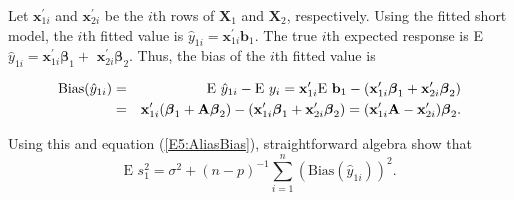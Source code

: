 Let $\mathbf{x}_{1i}^{\prime }$ and $\mathbf{x}_{2i}^{\prime }$ be
the $i$th rows of $\mathbf{X}_{1}$ and $\mathbf{X}_{2}$,
respectively. Using
the fitted short model, the $i$th fitted value is $\hat{y}_{1i}=\mathbf{x}%
_{1i}^{\prime }\mathbf{b}_{1}$. The true $i$th expected response is E $\hat{y%
}_{1i}=\mathbf{x}_{1i}^{\prime } \boldsymbol \beta_{1}+$
$\mathbf{x}_{2i}^{\prime } \boldsymbol \beta_{2}$. Thus, the bias of
the $i$th fitted value is

\begin{center}
\begin{eqnarray*}
\text{Bias}(\hat{y}_{1i}) &=&\text{E }\hat{y}_{1i}-\text{E }y_{i}=\mathbf{x}%
_{1i}^{\prime }\text{E }\mathbf{b}_{1}-\left( \mathbf{x}_{1i}^{\prime }%
\boldsymbol \beta_{1}+\mathbf{x}_{2i}^{\prime } \boldsymbol \beta_{2}\right)  \\
&=&\mathbf{x}_{1i}^{\prime }(\boldsymbol \beta_{1}+\mathbf{A \boldsymbol \beta }%
_{2})-\left( \mathbf{x}_{1i}^{\prime }\boldsymbol \beta_{1}+\mathbf{x}%
_{2i}^{\prime }\boldsymbol \beta_{2}\right) =(\mathbf{x}_{1i}^{\prime }\mathbf{%
A}-\mathbf{x}_{2i}^{\prime })\boldsymbol \beta_{2}.
\end{eqnarray*}
\end{center}

Using this and equation (\ref{E5:AliasBias}), straightforward
algebra show that
\begin{equation}\label{E5:SumBias}
\text{E }s_{1}^{2}=\sigma ^{2}+(n-p)^{-1}\sum_{i=1}^{n}(\text{Bias}(\hat{y}%
_{1i}))^{2}.
\end{equation}

